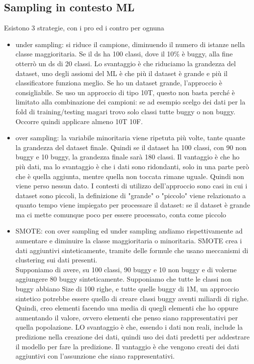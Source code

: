 \documentclass{article}
\begin{document}
\subsection{Sampling in contesto ML}
Esistono 3 strategie, con i pro ed i contro per ognuna
\begin{itemize}
\item under sampling: si riduce il campione, diminuendo il numero di istanze nella classe maggioritaria. Se il ds ha 100 classi, dove il 10\% è buggy, alla fine otterrò un ds di 20 classi. Lo svantaggio è che riduciamo la grandezza del dataset, uno degli assiomi del ML è che più il dataset è grande e più il classificatore funziona meglio. Se ho un dataset grande, l'approccio è consigliabile. Se uso un approccio di tipo 10T, questo non basta perché è limitato alla combinazione dei campioni: se ad esempio scelgo dei dati per la fold di training/testing magari trovo solo classi tutte buggy o non buggy. Occorre quindi applicare  almeno 10T 10F.
\item over sampling: la variabile minoritaria viene ripetuta più volte, tante quante la grandezza del dataset finale. Quindi se il dataset ha 100 classi, con 90 non buggy e 10 buggy, la grandezza finale sarà 180 classi. Il vantaggio è che ho più dati, ma lo svantaggio è che i dati sono ridondanti, solo in una parte però che è quella aggiunta, mentre quella non toccata rimane uguale. Quindi non viene perso nessun dato. I contesti di utilizzo dell'approccio sono casi in cui i dataset sono piccoli, la definizione di "grande" o "piccolo" viene relazionato a quanto tempo viene impiegato per processare il dataset: se il dataset è grande ma ci mette comunque poco per essere processato, conta come piccolo
\item SMOTE: con over sampling ed under sampling andiamo rispettivamente ad aumentare e diminuire la classe maggioritaria o minoritaria. SMOTE crea i dati aggiuntivi sinteticamente, tramite delle formule che usano meccanismi di clustering sui dati presenti. \\ Supponiamo di avere, su 100 classi, 90 buggy e 10 non buggy e di volerne aggiungere 80 buggy sinteticamente. Supponiamo che tutte le classi non buggy abbiano Size di 100 righe, e tutte quelle buggy di 1M, un approccio sintetico potrebbe essere quello di creare classi buggy aventi miliardi di righe. Quindi, creo elementi facendo una media di quegli elementi che ho oppure aumentando il valore, ovvero elementi che penso siano rappresentativi per quella popolazione. LO svantaggio è che, essendo i dati non reali, include la predizione nella creazione dei dati, quindi uso dei dati predetti per addestrare il modello per fare la predizione. Il vantaggio è che vengono creati dei dati aggiuntivi con l'assunzione che siano rappresentativi.
\end{itemize}
\end{document}
